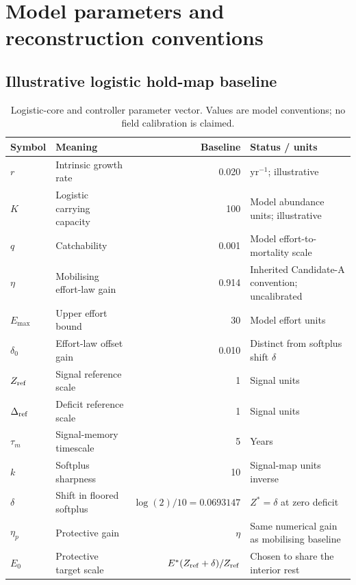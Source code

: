 \section{Model parameters and reconstruction conventions}\label{si:parameters}

\subsection{Illustrative logistic hold-map baseline}
\begin{table}[htbp]
\centering\small
\caption{Logistic-core and controller parameter vector. Values are model conventions; no field calibration is claimed.}
\label{tab:logistic-parameters}
\begin{tabularx}{\linewidth}{@{}l l r X@{}}
\toprule Symbol & Meaning & Baseline & Status / units \\
\midrule
\(r\) & Intrinsic growth rate & 0.020 & \(\mathrm{yr}^{-1}\); illustrative \\
\(K\) & Logistic carrying capacity & 100 & Model abundance units; illustrative \\
\(q\) & Catchability & 0.001 & Model effort-to-mortality scale \\
\(\eta\) & Mobilising effort-law gain & 0.914 & Inherited Candidate-A convention; uncalibrated \\
\(E_{\max}\) & Upper effort bound & 30 & Model effort units \\
\(\delta_0\) & Effort-law offset gain & 0.010 & Distinct from softplus shift \(\delta\) \\
\(Z_{\rm ref}\) & Signal reference scale & 1 & Signal units \\
\(\Delta_{\rm ref}\) & Deficit reference scale & 1 & Signal units \\
\(\tau_m\) & Signal-memory timescale & 5 & Years \\
\(k\) & Softplus sharpness & 10 & Signal-map units inverse \\
\(\delta\) & Shift in floored softplus & \(\log(2)/10=0.0693147\) & \(Z^*=\delta\) at zero deficit \\
\(\eta_p\) & Protective gain & \(\eta\) & Same numerical gain as mobilising baseline \\
\(E_0\) & Protective target scale & \(E^*(Z_{\rm ref}+\delta)/Z_{\rm ref}\) & Chosen to share the interior rest \\
\bottomrule
\end{tabularx}
\end{table}

